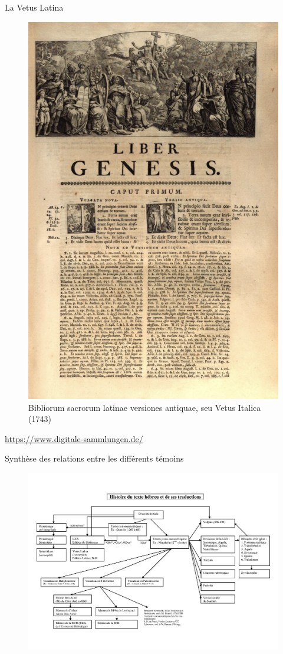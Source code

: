 \documentclass[11pt]{beamer}
\begin{document}
\begin{frame}{La Vetus Latina}
\begin{figure}
    \centering
    \includegraphics[width=0.5\linewidth]{img/vetus_latina_sabatier.png}
    \caption{Bibliorum sacrorum latinae versiones antiquae, seu Vetus Italica (1743)}
\end{figure}
\end{frame}
\begin{block}{}
    \href{https://www.digitale-sammlungen.de/en/view/bsb10798848?q=%28Bibliorum+sacrorum+latinae+versiones+antiquae%29&page=112,113}{https://www.digitale-sammlungen.de/}
\end{block}

\begin{frame}{Synthèse des relations entre les différents témoins}
\begin{figure}
    \centering
    \includegraphics[width=1\linewidth]{img/Tableau histoire du texte de la bible hébraïque.png}
\end{figure}
    
\end{frame}
\end{document}
